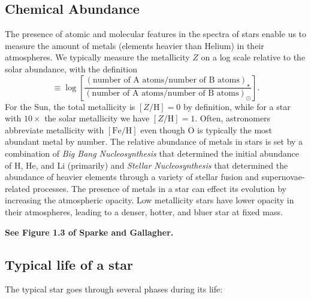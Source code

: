 \documentclass[12pt]{article}
\begin{document}
\subsection{Chemical Abundance}

The presence of atomic and molecular features in the spectra of stars enable us
to measure the amount of metals (elements heavier than Helium) in their atmospheres.
We typically measure the metallicity $Z$ on a log scale relative to the solar abundance,
with the definition
\begin{equation}
[A/B]\equiv \log \left[ \frac{(\mathrm{number\,\,of\,\,A\,\,atoms/number\,\,of\,\,B\,\,atoms})_{\star}}{(\mathrm{number\,\,of\,\,A\,\,atoms/number\,\,of\,\,B\,\,atoms})_{\odot}} \right].
\end{equation}
For the Sun, the total metallicity is $[Z/\mathrm{H}] = 0$ by definition, while for a star with $10\times$ the
solar metallicity we have $[Z/\mathrm{H}] = 1$. Often, astronomers abbreviate metallicity 
with $[\mathrm{Fe}/\mathrm{H}]$ even though O is typically the most abundant metal by number. 
The relative abundance of metals in stars is set by a combination of {\it Big Bang Nucleosynthesis}
that determined the initial abundance of H, He, and Li (primarily) and {\it Stellar Nucleosynthesis}
that determined the abundance of heavier elements through a variety of stellar fusion and supernovae-related
processes. The presence of metals in a star can effect its evolution by increasing the atmospheric opacity.
Low metallicity stars have lower opacity in their atmospheres, leading to a denser, hotter, and bluer star
at fixed mass.

{\bf See Figure 1.3 of Sparke and Gallagher.}

\subsection{Typical life of a star}

The typical star goes through several phases during its life:
\end{document}
